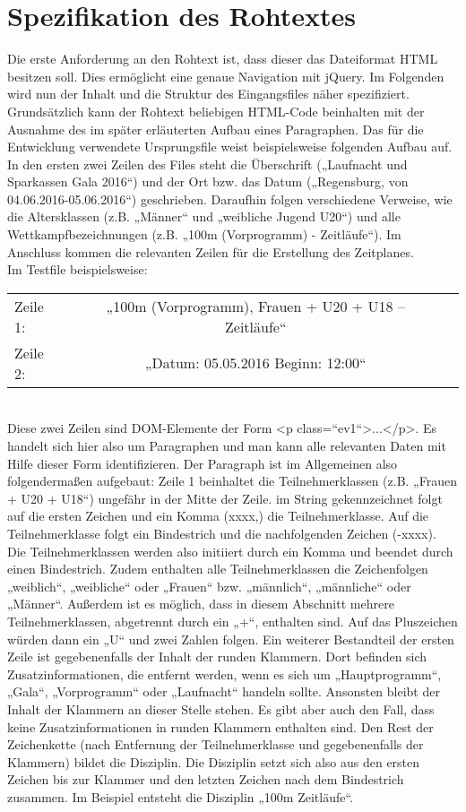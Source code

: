 {\section{Spezifikation des Rohtextes}
Die erste Anforderung an den Rohtext ist, dass dieser das Dateiformat HTML besitzen soll. Dies ermöglicht eine genaue Navigation mit jQuery. Im Folgenden wird nun der Inhalt und die Struktur des Eingangsfiles näher spezifiziert. Grundsätzlich kann der Rohtext beliebigen HTML-Code beinhalten mit der Ausnahme des im später erläuterten Aufbau eines Paragraphen. 
Das für die Entwicklung verwendete Ursprungsfile weist beispielsweise folgenden Aufbau auf. In den ersten zwei Zeilen des Files steht die Überschrift („Laufnacht und Sparkassen Gala 2016“) und der Ort bzw. das Datum („Regensburg, von 04.06.2016-05.06.2016“) geschrieben. Daraufhin folgen verschiedene Verweise, wie die Altersklassen (z.B. „Männer“ und „weibliche Jugend U20“) und alle Wettkampfbezeichnungen (z.B. „100m (Vorprogramm) - Zeitläufe“). Im Anschluss kommen die relevanten Zeilen für die Erstellung des Zeitplanes.\\
Im Testfile beispielsweise:\\
\begin{tabular}{lcr}
Zeile 1: & „100m (Vorprogramm), Frauen + U20 + U18 – Zeitläufe“ \\
Zeile 2: & „Datum: 05.05.2016 Beginn: 12:00“ \\
\end{tabular} \\
Diese zwei Zeilen sind DOM-Elemente der Form <p class=“ev1“>...</p>. Es handelt sich hier also um Paragraphen und man kann alle relevanten Daten mit Hilfe dieser Form identifizieren.
Der Paragraph ist im Allgemeinen also folgendermaßen aufgebaut:
Zeile 1 beinhaltet die Teilnehmerklassen (z.B. „Frauen + U20 + U18“) ungefähr in der Mitte der Zeile. im String gekennzeichnet folgt auf die ersten Zeichen und ein Komma (xxxx,) die Teilnehmerklasse. Auf die Teilnehmerklasse folgt ein Bindestrich und die nachfolgenden Zeichen (-xxxx). Die Teilnehmerklassen werden also initiiert durch ein Komma und beendet durch einen Bindestrich. Zudem enthalten alle Teilnehmerklassen die Zeichenfolgen „weiblich“, „weibliche“ oder „Frauen“ bzw. „männlich“, „männliche“ oder „Männer“. Außerdem ist es möglich, dass in diesem Abschnitt mehrere Teilnehmerklassen, abgetrennt durch ein „+“, enthalten sind. Auf das Pluszeichen würden dann ein „U“ und zwei Zahlen folgen. Ein weiterer Bestandteil der ersten Zeile ist gegebenenfalls der Inhalt der runden Klammern. Dort befinden sich Zusatzinformationen, die entfernt werden, wenn es sich um „Hauptprogramm“, „Gala“, „Vorprogramm“ oder „Laufnacht“ handeln sollte. Ansonsten bleibt der Inhalt der Klammern an dieser Stelle stehen. Es gibt aber auch den Fall, dass keine Zusatzinformationen in runden Klammern enthalten sind. Den Rest der Zeichenkette (nach Entfernung der Teilnehmerklasse und gegebenenfalls der Klammern) bildet die Disziplin. Die Disziplin setzt sich also aus den ersten Zeichen bis zur Klammer und den letzten Zeichen nach dem Bindestrich zusammen. Im Beispiel entsteht die Disziplin „100m Zeitläufe“.
}
